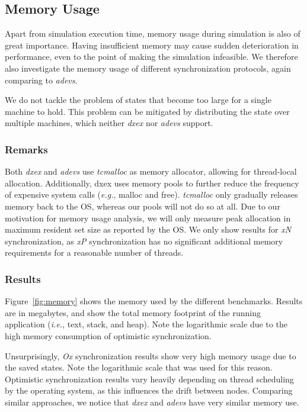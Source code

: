 \subsection{Memory Usage}
Apart from simulation execution time, memory usage during simulation is also of great importance.
Having insufficient memory may cause sudden deterioration in performance, even to the point of making the simulation infeasible.
We therefore also investigate the memory usage of different synchronization protocols, again comparing to \textit{adevs}.

We do not tackle the problem of states that become too large for a single machine to hold.
This problem can be mitigated by distributing the state over multiple machines, which neither \textit{dxex} nor \textit{adevs} support.

\subsubsection{Remarks}
Both \textit{dxex} and \textit{adevs} use \textit{tcmalloc} as memory allocator, allowing for thread-local allocation.
Additionally, dxex uses memory pools to further reduce the frequency of expensive system calls (\textit{e.g.}, malloc and free).
\textit{tcmalloc} only gradually releases memory back to the OS, whereas our pools will not do so at all.
Due to our motivation for memory usage analysis, we will only measure peak allocation in maximum resident set size as reported by the OS.
We only show results for \textit{xN} synchronization, as \textit{xP} synchronization has no significant additional memory requirements for a reasonable number of threads.

\subsubsection{Results}
Figure~\ref{fig:memory} shows the memory used by the different benchmarks.
Results are in megabytes, and show the total memory footprint of the running application (\textit{i.e.}, text, stack, and heap).
Note the logarithmic scale due to the high memory consumption of optimistic synchronization.

Unsurprisingly, \textit{Ox} synchronization results show very high memory usage due to the saved states.
Note the logarithmic scale that was used for this reason.
Optimistic synchronization results vary heavily depending on thread scheduling by the operating system, as this influences the drift between nodes. 
Comparing similar approaches, we notice that \textit{dxex} and \textit{adevs} have very similar memory use.

